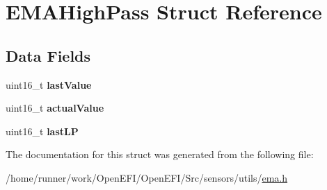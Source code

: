 \hypertarget{structEMAHighPass}{}\section{E\+M\+A\+High\+Pass Struct Reference}
\label{structEMAHighPass}
\subsection*{Data Fields}
\begin{DoxyCompactItemize}
\item 
\mbox{\label{structEMAHighPass_a53df4bb1628740263789e44d94d75b26}} 
uint16\+\_\+t {\bfseries last\+Value}
\item 
\mbox{\label{structEMAHighPass_a405250df44c61a455d676a0f13bfe32b}} 
uint16\+\_\+t {\bfseries actual\+Value}
\item 
\mbox{\label{structEMAHighPass_a38075a21f728f8d39f150825dbc45ef5}} 
uint16\+\_\+t {\bfseries last\+LP}
\end{DoxyCompactItemize}


The documentation for this struct was generated from the following file\+:\begin{DoxyCompactItemize}
\item 
/home/runner/work/\+Open\+E\+F\+I/\+Open\+E\+F\+I/\+Src/sensors/utils/\hyperlink{ema_8h}{ema.\+h}\end{DoxyCompactItemize}
